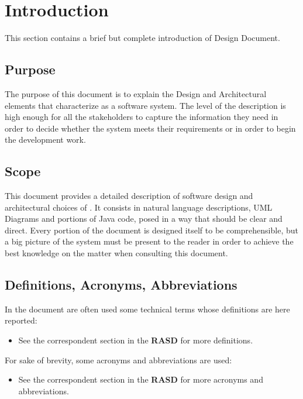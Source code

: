 \section{Introduction}
This section contains a brief but complete introduction of \myTaxiService{} Design Document.

\subsection{Purpose}
The purpose of this document is to explain the Design and Architectural elements that characterize \myTaxiService{} as a software system. The level of the description is high enough for all the stakeholders to capture the information they need in order to decide whether the system meets their requirements or in order to begin the development work.

\subsection{Scope}
This document provides a detailed description of \myTaxiService{} software design and architectural choices of \myTaxiService{}.
It consists in natural language descriptions, UML Diagrams and portions of Java code, posed in a way that should be clear and direct.
Every portion of the document is designed itself to be comprehensible, but a big picture of the system must be present to the reader in order to achieve the best knowledge on the matter when consulting this document.

\subsection{Definitions, Acronyms, Abbreviations}
In the document are often used some technical terms whose definitions are here reported:
\begin{itemize}
	 A software level in a software system.
	 An hardware level in a software system.
	 A digital database whose organization is based on the relational model of data, as proposed by E.F. Codd in 1970.
	 A strict application of MVC principles.
	\item See the correspondent section in the \textbf{RASD} for more definitions.
\end{itemize}
For sake of brevity, some acronyms and abbreviations are used:
\begin{itemize}
	 Design Document.
	 Global Positioning System.
	 Graphic User Interface.
	 Application Programming Interface.
	 Model View Controller.
	 Estimated Time of Arrival.
	\item See the correspondent section in the \textbf{RASD} for more acronyms and abbreviations.
\end{itemize}

